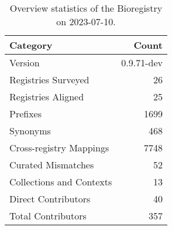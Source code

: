 \begin{table}
\caption{Overview statistics of the Bioregistry on 2023-07-10.}
\label{tab:bioregistry-summary}
\begin{tabular}{lr}
\toprule
Category & Count \\
\midrule
Version & 0.9.71-dev \\
Registries Surveyed & 26 \\
Registries Aligned & 25 \\
Prefixes & 1699 \\
Synonyms & 468 \\
Cross-registry Mappings & 7748 \\
Curated Mismatches & 52 \\
Collections and Contexts & 13 \\
Direct Contributors & 40 \\
Total Contributors & 357 \\
\bottomrule
\end{tabular}
\end{table}
